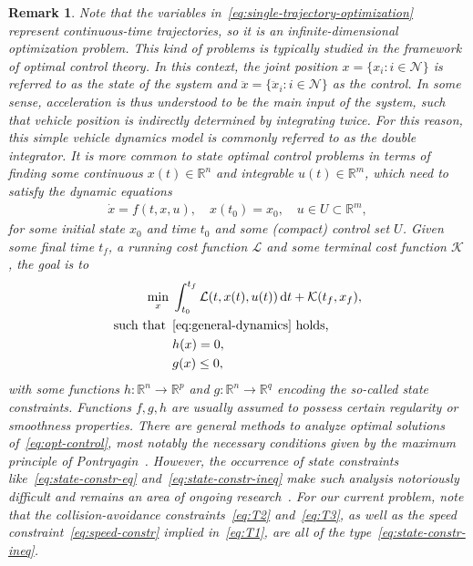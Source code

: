 \documentclass[a4paper]{report}
\theoremstyle{definition}
\theoremstyle{plain}
\newtheorem{remarknum}{Remark}[chapter]
\newcommand*\diff{\mathop{}\!\mathrm{d}}
\begin{document}
\begin{remarknum}\label{rem:state-constraints}
  Note that the variables in~\eqref{eq:single-trajectory-optimization} represent
  continuous-time trajectories, so it is an infinite-dimensional optimization
  problem.
  This kind of problems is typically studied in the framework of optimal control theory.
  In this context, the joint position $x = \{x_{i} : i \in \mathcal{N}\}$ is
  referred to as the \emph{state} of the system and
  $\ddot{x} = \{\ddot{x}_{i} : i \in \mathcal{N} \}$ as the \emph{control}.
  In some sense, acceleration is thus understood to be the main input of the system, such that
  vehicle position is indirectly determined by integrating twice. For this reason,
  this simple vehicle dynamics model is commonly referred to as the \emph{double integrator}.
  It is more common to state optimal control problems in terms of finding some
  continuous $x(t) \in \mathbb{R}^{n}$ and integrable $u(t) \in \mathbb{R}^{m}$,
  which need to satisfy the dynamic equations
  \begin{align}\label{eq:general-dynamics}
    \dot{x} = f(t, x, u) , \quad x(t_{0}) = x_{0} , \quad u \in U \subset \mathbb{R}^{m},
  \end{align}
  for some initial state $x_{0}$ and time $t_{0}$ and some (compact) control set
  $U$. Given some final time $t_{f}$, a running cost function $\mathcal{L}$ and
  some terminal cost function $\mathcal{K}$, the goal is to
  \begin{subequations}\label{eq:opt-control}
  \begin{align}
    \min_{x} \; & \int_{t_{0}}^{t_{f}} \mathcal{L}(t, x(t), u(t)) \diff t + \mathcal{K}(t_{f}, x_{f}) , \\
      \textnormal{such that } \, &\eqref{eq:general-dynamics} \textnormal{ holds, } \\
                    & h(x) = 0 , \label{eq:state-constr-eq} \\
                    & g(x) \leq 0 , \label{eq:state-constr-ineq}
  \end{align}
  \end{subequations}
  with some functions $h : \mathbb{R}^{n} \rightarrow \mathbb{R}^{p}$ and
  $g : \mathbb{R}^{n} \rightarrow \mathbb{R}^{q}$ encoding the so-called state
  constraints. Functions $f, g, h$ are usually assumed to possess certain
  regularity or smoothness properties.
  There are general methods to analyze optimal solutions
  of~\eqref{eq:opt-control}, most notably the necessary conditions given by the
  maximum principle of Pontryagin~\cite{liberzonCalculusVariationsOptimal}.
  However, the occurrence of state constraints like~\eqref{eq:state-constr-eq}
  and~\eqref{eq:state-constr-ineq} make such analysis notoriously difficult and
  remains an area of ongoing research~\cite{hartlSurveyMaximumPrinciples1995}.
  For our current problem, note that the collision-avoidance
  constraints~\eqref{eq:T2} and~\eqref{eq:T3}, as well as the speed
  constraint~\eqref{eq:speed-constr} implied in~\eqref{eq:T1}, are all of the
  type~\eqref{eq:state-constr-ineq}.
\end{remarknum}
\end{document}
